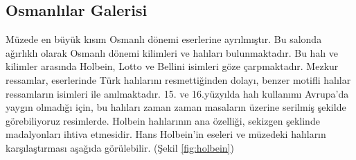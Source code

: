 \subsection{Osmanlılar Galerisi}
\indent\indent Müzede en büyük kısım Osmanlı dönemi eserlerine ayrılmıştır. Bu salonda ağırlıklı olarak Osmanlı dönemi kilimleri ve halıları bulunmaktadır. Bu halı ve kilimler arasında Holbein, Lotto ve Bellini isimleri göze çarpmaktadır. Mezkur ressamlar, eserlerinde Türk halılarını resmettiğinden dolayı, benzer motifli halılar ressamların isimleri ile anılmaktadır. 15. ve 16.yüzyılda halı kullanımı Avrupa'da yaygın olmadığı için, bu halıları zaman zaman masaların üzerine serilmiş şekilde görebiliyoruz resimlerde. Holbein halılarının ana özelliği, sekizgen şeklinde madalyonları ihtiva etmesidir. Hans Holbein'in eseleri ve müzedeki halıların karşılaştırması aşağıda görülebilir. (Şekil \ref{fig:holbein})\newline
